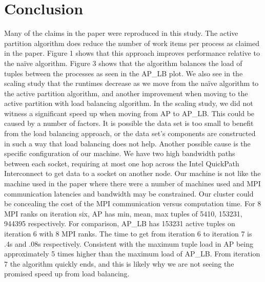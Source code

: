 \documentclass[11pt]{elsarticle}
\begin{document}
\section{Conclusion}
   Many of the claims in the paper were reproduced in this study. The active partition algorithm does reduce the number of work items per process as claimed in the paper. Figure 1 shows that this approach improves performance relative to the na{\"i}ve algorithm. Figure 3 shows that the algorithm balances the load of tuples between the processes as seen in the AP\_LB plot. We also see in the scaling study that the runtimes decrease as we move from the na{\"i}ve algorithm to the active partition algorithm, and another improvement when moving to the active partition with load balancing algorithm.
   In the scaling study, we did not witness a significant speed up when moving from AP to AP\_LB. This could be caused by a number of factors. It is possible the data set is too small to benefit from the load balancing approach, or the data set's components are constructed in such a way that load balancing does not help. Another possible cause is the specific configuration of our machine. We have two high bandwidth paths between each socket, requiring at most one hop across the Intel QuickPath Interconnect to get data to a socket on another node. Our machine is not like the machine used in the paper where there were a number of machines used and MPI communication latencies and bandwidth may be constrained. Our cluster could be concealing the cost of the MPI communication versus computation time. For 8 MPI ranks on iteration six, AP has min, mean, max tuples of 5410, 153231, 944395 respectively. For comparison, AP\_LB has 153231 active tuples on iteration 6 with 8 MPI ranks. The time to get from iteration 6 to iteration 7 is .4s and .08s respectively. Consistent with the maximum tuple load in AP being approximately 5 times higher than the maximum load of AP\_LB. From iteration 7 the algorithm quickly ends, and this is likely why we are not seeing the promised speed up from load balancing.



\end{document}
